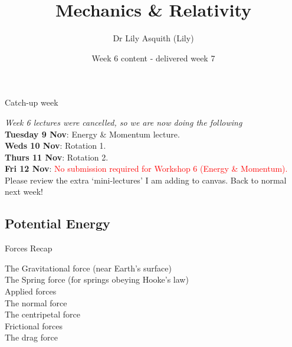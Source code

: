 


% 
\title[ Mechanics \& Relativity]{Mechanics \& Relativity}
\author[Dr Lily Asquith (Lily)]{ Dr Lily Asquith (Lily)}
\date[Week 6 content - delivered week 7]{Week 6 content - delivered week 7}





\begin{frame}
\titlepage
\end{frame} 


\begin{frame}{Catch-up week}

\textit{Week 6 lectures were cancelled, so we are now doing the following}\\[1ex]

\textbf{Tuesday 9 Nov}: Energy \& Momentum lecture.\\[1ex]

\textbf{Weds 10 Nov}:  Rotation 1.\\[1ex]

\textbf{Thurs 11 Nov}:  Rotation 2.\\[1ex]

\textbf{Fri 12 Nov}:  \textcolor{red}{No submission required for Workshop 6 (Energy \& Momentum).}\\[1ex]

Please review the extra `mini-lectures' I am adding to canvas. Back to normal next week!\\[1ex]

\end{frame}

 \subsection{Potential Energy}


\begin{frame}{Forces Recap}

\small

The Gravitational force (near Earth's surface)\\[2ex]
The Spring force (for springs obeying Hooke's law)\\[2ex]
Applied forces\\[2ex]
The normal force\\[2ex]
The centripetal force\\[2ex]
Frictional forces\\[2ex]
The drag force\\[2ex]


\vspace{10cm}
\end{frame}




